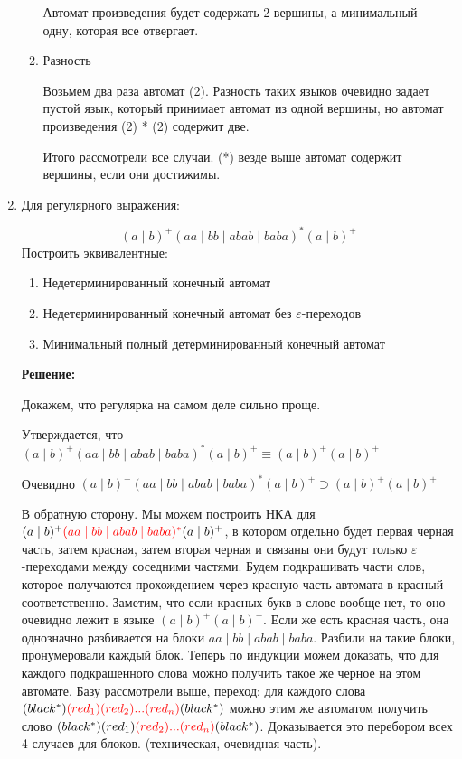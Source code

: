 \documentclass[12pt]{article}
\begin{document}
\begin{enumerate}
\begin{enumerate}
    Автомат произведения будет содержать 2 вершины, а минимальный - одну, которая все отвергает. 

  \item Разность

    Возьмем два раза автомат (2). Разность таких языков очевидно задает пустой язык, который принимает автомат из одной вершины, но автомат произведения (2) * (2) содержит две.


    Итого рассмотрели все случаи.
    (*) везде выше автомат содержит вершины, если они достижимы.

  \end{enumerate}

 

  \item Для регулярного выражения:
 
  \[ (a \mid b)^+ (aa \mid bb \mid abab \mid baba)^* (a \mid b)^+\]
  Построить эквивалентные:
  \begin{enumerate}
    \item Недетерминированный конечный автомат
    \item Недетерминированный конечный автомат без $\varepsilon$-переходов
    \item Минимальный полный детерминированный конечный автомат
  \end{enumerate}

  {\bf Решение:}

  Докажем, что регулярка на самом деле сильно проще. 

  Утверждается, что ${ (a \mid b)^+ (aa \mid bb \mid abab \mid baba)^* (a \mid b)^+} \equiv { (a \mid b)^+ (a \mid b)^+  }$ 

  Очевидно ${ (a \mid b)^+ (aa \mid bb \mid abab \mid baba)^* (a \mid b)^+} \supset { (a \mid b)^+ (a \mid b)^+  }$ 

  В обратную сторону. Мы можем построить НКА для ${ (a \mid b)^+ \textcolor{red}{(aa \mid bb \mid abab \mid baba)^*} (a \mid b)^+}$, в котором
  отдельно будет первая черная часть, затем красная, затем вторая черная и связаны они будут только $\varepsilon$-переходами между соседними частями.
  Будем подкрашивать части слов, которое получаются прохождением через красную часть автомата в красный соответственно. Заметим, что если красных букв в слове вообще нет, то
  оно очевидно лежит в языке  ${ (a \mid b)^+ (a \mid b)^+  }$. Если же есть красная часть, она однозначно разбивается на блоки $aa \mid bb \mid abab \mid baba$. Разбили на такие блоки, 
  пронумеровали каждый блок. Теперь по индукции можем доказать, что для каждого подкрашенного слова можно получить такое же черное на этом автомате. Базу рассмотрели выше, переход: для каждого слова  $(black^*) \textcolor{red}{(red_{1})(red_{2}) ... (red_{n})}(black^*)$ можно этим же автоматом 
  получить слово $(black^*)(red_{1}) \textcolor{red}{(red_{2})...(red_{n})} (black^*)$. Доказывается это перебором всех 4 случаев для блоков. (техническая, очевидная часть). 


\end{enumerate}
\end{document}
